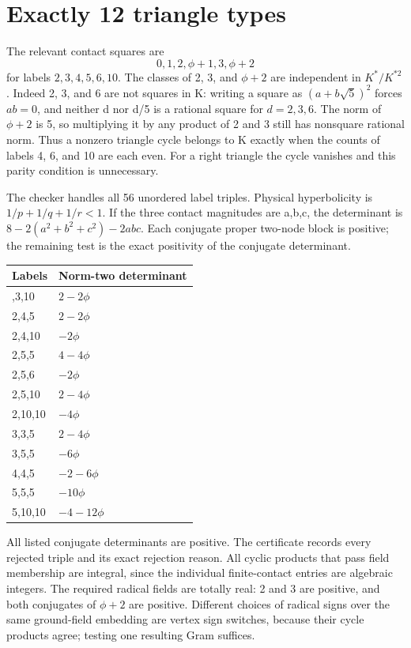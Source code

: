 \documentclass[
  10pt,
]{report}
\newcounter{none} %
\begin{document}
\section{Exactly 12 triangle types}\label{exactly-12-triangle-types}

The relevant contact squares are \[
0,1,2,\phi+1,3,\phi+2
\] for labels \(2,3,4,5,6,10\). The classes of 2, 3, and \(\phi+2\) are
independent in \(K^*/K^{*2}\). Indeed 2, 3, and 6 are not squares in K:
writing a square as \((a+b\sqrt5)^2\) forces \(ab=0\), and neither d nor
d/5 is a rational square for \(d=2,3,6\). The norm of \(\phi+2\) is 5,
so multiplying it by any product of 2 and 3 still has nonsquare rational
norm. Thus a nonzero triangle cycle belongs to K exactly when the counts
of labels 4, 6, and 10 are each even. For a right triangle the cycle
vanishes and this parity condition is unnecessary.

The checker handles all 56 unordered label triples. Physical
hyperbolicity is \(1/p+1/q+1/r<1\). If the three contact magnitudes are
a,b,c, the determinant is \(8-2(a^2+b^2+c^2)-2abc\). Each conjugate
proper two-node block is positive; the remaining test is the exact
positivity of the conjugate determinant.

{\def\LTcaptype{none} %
\begin{longtable}[]{@{}ll@{}}
\toprule\noalign{}
Labels & Norm-two determinant \\
\midrule\noalign{}
\endhead
\bottomrule\noalign{}
\endlastfoot
2,3,10 & \(2-2\phi\) \\
2,4,5 & \(2-2\phi\) \\
2,4,10 & \(-2\phi\) \\
2,5,5 & \(4-4\phi\) \\
2,5,6 & \(-2\phi\) \\
2,5,10 & \(2-4\phi\) \\
2,10,10 & \(-4\phi\) \\
3,3,5 & \(2-4\phi\) \\
3,5,5 & \(-6\phi\) \\
4,4,5 & \(-2-6\phi\) \\
5,5,5 & \(-10\phi\) \\
5,10,10 & \(-4-12\phi\) \\
\end{longtable}
}

All listed conjugate determinants are positive. The certificate records
every rejected triple and its exact rejection reason. All cyclic
products that pass field membership are integral, since the individual
finite-contact entries are algebraic integers. The required radical
fields are totally real: 2 and 3 are positive, and both conjugates of
\(\phi+2\) are positive. Different choices of radical signs over the
same ground-field embedding are vertex sign switches, because their
cycle products agree; testing one resulting Gram suffices.
\end{document}
